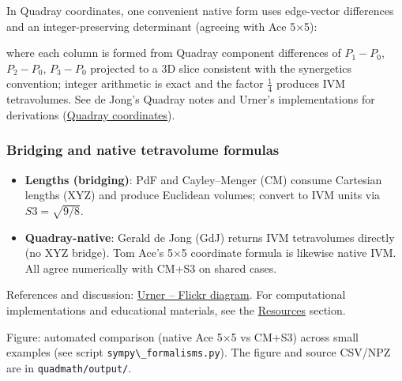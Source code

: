 \documentclass[
  10pt,
]{article}
\newcommand{\passthrough}[1]{#1}
\providecommand{\tightlist}{%
  \setlength{\itemsep}{0pt}\setlength{\parskip}{0pt}}
\begin{document}
\begin{itemize}
  In Quadray coordinates, one convenient native form uses edge-vector
  differences and an integer-preserving determinant (agreeing with Ace
  5×5):

  where each column is formed from Quadray component differences of
  \(P_1-P_0\), \(P_2-P_0\), \(P_3-P_0\) projected to a 3D slice
  consistent with the synergetics convention; integer arithmetic is
  exact and the factor \(\tfrac{1}{4}\) produces IVM tetravolumes. See
  de Jong's Quadray notes and Urner's implementations for derivations
  (\href{https://en.wikipedia.org/wiki/Quadray_coordinates}{Quadray
  coordinates}).
\end{itemize}

\hypertarget{bridging-and-native-tetravolume-formulas}{%
\subsubsection{Bridging and native tetravolume
formulas}\label{bridging-and-native-tetravolume-formulas}}

\begin{itemize}
\tightlist
\item
  \textbf{Lengths (bridging)}: PdF and Cayley--Menger (CM) consume
  Cartesian lengths (XYZ) and produce Euclidean volumes; convert to IVM
  units via \(S3 = \sqrt{9/8}\).
\item
  \textbf{Quadray-native}: Gerald de Jong (GdJ) returns IVM tetravolumes
  directly (no XYZ bridge). Tom Ace's 5×5 coordinate formula is likewise
  native IVM. All agree numerically with CM+S3 on shared cases.
\end{itemize}

References and discussion: \href{https://flic.kr/p/2rn22en}{Urner --
Flickr diagram}. For computational implementations and educational
materials, see the \href{07_resources.md}{Resources} section.

Figure: automated comparison (native Ace 5×5 vs CM+S3) across small
examples (see script \passthrough{\lstinline!sympy\_formalisms.py!}).
The figure and source CSV/NPZ are in
\passthrough{\lstinline!quadmath/output/!}.
\end{document}
